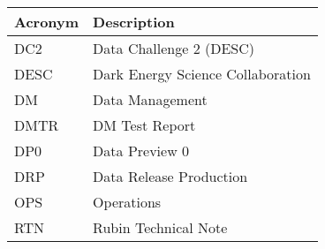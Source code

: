 \addtocounter{table}{-1}
\begin{longtable}{p{}p{}}\hline
\textbf{Acronym} & \textbf{Description}  \\\hline

DC2 & Data Challenge 2 (DESC) \\\hline
DESC & Dark Energy Science Collaboration \\\hline
DM & Data Management \\\hline
DMTR & DM Test Report \\\hline
DP0 & Data Preview 0 \\\hline
DRP & Data Release Production \\\hline
OPS & Operations \\\hline
RTN & Rubin Technical Note \\\hline
\end{longtable}
